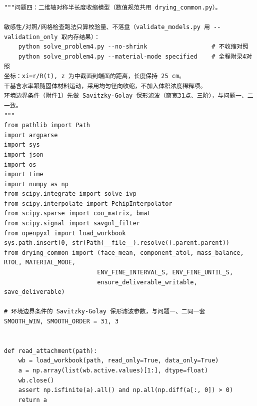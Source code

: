 \documentclass[12pt,a4paper]{ctexart}
\begin{document}
\begin{lstlisting}[caption={solve\_problem4.py }]
"""问题四：二维轴对称半长度收缩模型（数值规范共用 drying_common.py）。

敏感性/对照/网格检查跑法只算校验量、不落盘（validate_models.py 用 --validation_only 取内存结果）：
    python solve_problem4.py --no-shrink                  # 不收缩对照
    python solve_problem4.py --material-mode specified    # 全程附录4对照
坐标：xi=r/R(t), z 为中截面到端面的距离，长度保持 25 cm。
干基含水率跟随固体材料运动，采用均匀径向收缩，不加入体积浓度稀释项。
环境边界条件（附件1）先做 Savitzky-Golay 保形滤波（窗宽31点、三阶），与问题一、二一致。
"""
from pathlib import Path
import argparse
import sys
import json
import os
import time
import numpy as np
from scipy.integrate import solve_ivp
from scipy.interpolate import PchipInterpolator
from scipy.sparse import coo_matrix, bmat
from scipy.signal import savgol_filter
from openpyxl import load_workbook
sys.path.insert(0, str(Path(__file__).resolve().parent.parent))
from drying_common import (face_mean, component_atol, mass_balance, RTOL, MATERIAL_MODE,
                          ENV_FINE_INTERVAL_S, ENV_FINE_UNTIL_S,
                          ensure_deliverable_writable, save_deliverable)

# 环境边界条件的 Savitzky-Golay 保形滤波参数，与问题一、二同一套
SMOOTH_WIN, SMOOTH_ORDER = 31, 3


def read_attachment(path):
    wb = load_workbook(path, read_only=True, data_only=True)
    a = np.array(list(wb.active.values)[1:], dtype=float)
    wb.close()
    assert np.isfinite(a).all() and np.all(np.diff(a[:, 0]) > 0)
    return a



\end{lstlisting}
\end{document}
